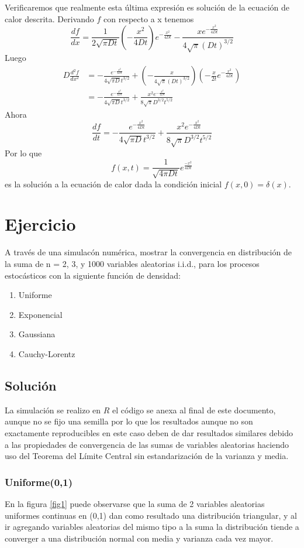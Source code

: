 \documentclass[paper=letter, fontsize=11pt]{scrartcl}
\numberwithin{equation}{section} %
\numberwithin{figure}{section} %
\numberwithin{table}{section} %
\begin{document}
Verificaremos que realmente esta \'ultima expresi\'on es soluci\'on de la ecuaci\'on de calor descrita. Derivando $f$ con respecto a x tenemos $$\frac{df}{dx}=\frac{1}{2\sqrt{\pi Dt}}\left(-\frac{x^2}{4Dt}\right)e^{-\frac{x^2}{4Dt}}-\frac{xe^{-\frac{x^2}{4Dt}}}{4\sqrt{\pi}(Dt)^{3/2}}$$ Luego \begin{equation*}
\begin{split}
D\frac{d^2 f}{dx^2}&=-\frac{e^{-\frac{x^2}{4Dt}}}{4\sqrt{\pi D }t^{3/2}}+\left(-\frac{x}{4\sqrt{\pi}(Dt)^{3/2}}\right)\left(-\frac{x}{2t}e^{-\frac{x^2}{4Dt}}\right)\\ 
&=-\frac{e^{-\frac{x^2}{4Dt}}}{4\sqrt{\pi D}t^{3/2}}+\frac{x^2 e^{-\frac{x^2}{4Dt}}}{8\sqrt{\pi} D^{3/2}t^{5/2}}
\end{split}
\end{equation*} Ahora $$\frac{df}{dt}=-\frac{e^{-\frac{x^2}{4Dt}}}{4\sqrt{\pi D}t^{3/2}}+\frac{x^2 e^{-\frac{x^2}{4Dt}}}{8\sqrt{\pi} D^{3/2}t^{5/2}}$$ Por lo que $$f(x,t)=\frac{1}{\sqrt{4\pi Dt}}e^{\frac{-x^2}{4Dt}}$$ es la soluci\'on a la ecuaci\'on de calor dada la condici\'on inicial $f(x,0)=\delta(x)$.

\section{Ejercicio}
A través de una simulac\'on num\'erica, mostrar la convergencia en
distribuci\'on de la suma de n = 2, 3, y 1000 variables aleatorias i.i.d., para los procesos
estoc\'asticos con la siguiente funci\'on de densidad: \begin{enumerate}
    \item Uniforme
    \item Exponencial
    \item Gaussiana
    \item Cauchy-Lorentz
\end{enumerate}

\subsection{Soluci\'on}
La simulaci\'on se realizo en $R$ el c\'odigo se anexa al final de este documento, aunque no se fijo una semilla por lo que los resultados aunque no son exactamente reproducibles en este caso deben de dar resultados similares debido a las propiedades de convergencia de las sumas de variables aleatorias haciendo uso del Teorema del L\'imite Central sin estandarizaci\'on de la varianza y media.
\subsubsection{Uniforme(0,1)}
En la figura \ref{fig1} puede observarse que la suma de 2 variables aleatorias uniformes continuas en (0,1) dan como resultado una distribuci\'on triangular, y al ir agregando variables aleatorias del mismo tipo a la suma la distribuci\'on tiende a converger a una distribuci\'on normal con media y varianza cada vez mayor.
\end{document}

